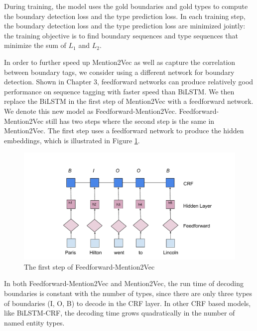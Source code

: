 During training, the model uses the gold boundaries and gold types to compute the boundary detection loss and the type prediction loss. In each training step, the boundary detection loss and the type prediction loss are minimized jointly: the training objective is to find boundary sequences and type sequences that minimize the sum of $L_{1}$ and $L_{2}$.


In order to further speed up Mention2Vec as well as capture the correlation between boundary tags, we consider using a different network for boundary detection. Shown in Chapter 3, feedforward networks can produce relatively good performance on sequence tagging with faster speed than BiLSTM. We then replace the BiLSTM in the first step of Mention2Vec with a feedforward network. We denote this new model as Feedforward-Mention2Vec. Feedforward-Mention2Vec still has two steps where the second step is the same in Mention2Vec. The first step uses a feedforward network to produce the hidden embeddings, which is illustrated in Figure \ref{fig:mention2vec3}.

\begin{figure}
  \centering
  \includegraphics[scale=0.6]{mention2vec3.pdf}
 \caption{The first step of Feedforward-Mention2Vec}
  \label{fig:mention2vec3}
\end{figure}

In both Feedforward-Mention2Vec and Mention2Vec, the run time of decoding boundaries is constant with the number of types, since there are only three types of boundaries (I, O, B) to decode in the CRF layer. In other CRF based models, like BiLSTM-CRF, the decoding time grows quadratically in the number of named entity types. 

